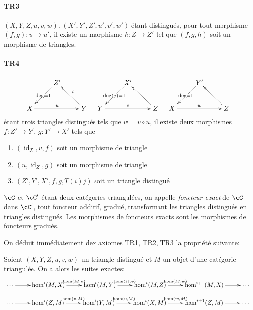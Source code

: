 \paragraph{TR3}
\hypertarget{VIII:TR3}{}

$(X,Y,Z,u,v,w)$, $(X',Y',Z',u',v',w')$ étant distingués, pour tout 
morphisme $(f,g):u\to u'$, il existe un morphisme $h:Z\to Z'$ tel que $(f,g,h)$ 
soit un morphisme de triangles. 


\paragraph{TR4}
\hypertarget{VIII:TR4}{}

\[\xymatrix{
  & Z' \ar[dl]|{\deg=1} \\
  X \ar[rr]^-u 
    & & Y \ar[ul]_-i 
}\quad
\xymatrix{
  & X' \ar[dl]|{\deg(j)=1} \\
  Y \ar[rr]^-v 
    & & Z \ar[ul] 
}\quad
\xymatrix{
  & Y' \ar[dl]|{\deg=1} \\
  X \ar[rr]^-w 
    & & Z \ar[ul] 
}\]
étant trois triangles distingués tels que $w=v\circ u$, il existe deux 
morphismes $f:Z'\to Y'$, $g:Y' \to X'$ tels que 
\begin{enumerate}
  \item $(\operatorname{id}_X, v, f)$ soit un morphisme de triangle 
  \item $(u,\operatorname{id}_Z,g)$ soit un morphisme de triangle 
  \item $(Z',Y',X',f,g,T(i) j)$ soit un triangle distingué
\end{enumerate}

$\cC$ et $\cC'$ étant deux catégories triangulées, on appelle 
\emph{foncteur exact} de $\cC$ dans $\cC'$, tout foncteur additif, gradué, 
transformant les triangles distingués en triangles distingués. Les 
morphismes de foncteurs exacts sont les morphismes de foncteurs gradués. 

On déduit immédiatement dex axiomes \hyperlink{VIII:TR1}{TR1}, 
\hyperlink{VIII:TR2}{TR2}, \hyperlink{VIII:TR3}{TR3} la propriété suivante: 





\begin{proposition}\label{VIII:1-1-2}
Soient $(X,Y,Z,u,v,w)$ un triangle distingué et $M$ un objet d'une 
catégorie triangulée. On a alors les suites exactes: 
\[\xymatrix{
  \cdots \ar[r] 
    & \hom^i(M,X) \ar[r]^-{\hom(M,u)} 
    & \hom^i(M,Y) \ar[r]^-{\hom(M,v)} 
    & \hom^i(M,Z) \ar[r]^-{\hom(M,w)} 
    & \hom^{i+1}(M,X) \ar[r] 
    & \cdots
}\]
\[\xymatrix{
  \cdots \ar[r] 
    & \hom^i(Z,M) \ar[r]^-{\hom(v,M)} 
    & \hom^i(Y,M) \ar[r]^-{\hom(u,M)} 
    & \hom^i(X,M) \ar[r]^-{\hom(w,M)} 
    & \hom^{i+1}(Z,M) \ar[r] 
    & \cdots
}\]
\end{proposition}


